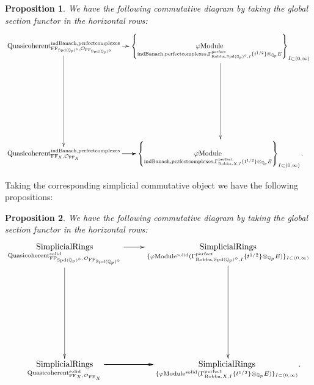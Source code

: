 \documentclass[12pt]{book}
\newtheorem{proposition}{Proposition}
\theoremstyle{definition}
\begin{document}
\begin{proposition}
We have the following commutative diagram by taking the global section functor in the horizontal rows:
\[\displayindent=+0in
\xymatrix@C-0.2in@R+7pc{
\mathrm{Quasicoherent}^{\mathrm{indBanach,perfectcomplexes}}_{\mathrm{FF}_{\mathrm{Spd}(\mathbb{Q}_p)^\diamond},\mathcal{O}_{\mathrm{FF}_{\mathrm{Spd}(\mathbb{Q}_p)^\diamond}}} \ar[d]\ar[r] &\left\{\underset{\mathrm{indBanach,perfectcomplexes},\Gamma^\text{perfect}_{\text{Robba},\mathrm{Spd}(\mathbb{Q}_p)^\diamond,I}\{t^{1/2}\}\otimes_{\mathbb{Q}_p}E}{\varphi\mathrm{Module}}\right\}_{I\subset (0,\infty)}\ar[d]\\
\mathrm{Quasicoherent}^{\mathrm{indBanach,perfectcomplexes}}_{\mathrm{FF}_X,\mathcal{O}_{\mathrm{FF}_X}}  \ar[r] \ar[r] \ar[r] &\left\{\underset{\mathrm{indBanach,perfectcomplexes},\Gamma^\text{perfect}_{\text{Robba},X,I}\{t^{1/2}\}\otimes_{\mathbb{Q}_p}E}{\varphi\mathrm{Module}}\right\}_{I\subset (0,\infty)}.    
}
\]

\end{proposition}


\indent Taking the corresponding simplicial commutative object we have the following propositions:

\begin{proposition}
We have the following commutative diagram by taking the global section functor in the horizontal rows:
\[\displayindent=+0in
\xymatrix@R+7pc{
\underset{\mathrm{Quasicoherent}^{\mathrm{solid}}_{\mathrm{FF}_{\mathrm{Spd}(\mathbb{Q}_p)^\diamond},\mathcal{O}_{\mathrm{FF}_{\mathrm{Spd}(\mathbb{Q}_p)^\diamond}}}}{\mathrm{SimplicialRings}} \ar[d] \ar[r] &\underset{\{\varphi\mathrm{Module}^{\mathrm{solid}}(\Gamma^\text{perfect}_{\text{Robba},{\mathrm{Spd}(\mathbb{Q}_p)^\diamond},I}\{t^{1/2}\}\otimes_{\mathbb{Q}_p}E)\}_{I\subset (0,\infty)}}{\mathrm{SimplicialRings}} \ar[d]\\
\underset{\mathrm{Quasicoherent}^{\mathrm{solid}}_{\mathrm{FF}_X,\mathcal{O}_{\mathrm{FF}_X}}}{\mathrm{SimplicialRings}}  \ar[r] \ar[r] \ar[r] &\underset{\{\varphi\mathrm{Module}^{\mathrm{solid}}(\Gamma^\text{perfect}_{\text{Robba},X,I}\{t^{1/2}\}\otimes_{\mathbb{Q}_p}E)\}_{I\subset (0,\infty)}}{\mathrm{SimplicialRings}}.
}
\]
\end{proposition}
\end{document}
